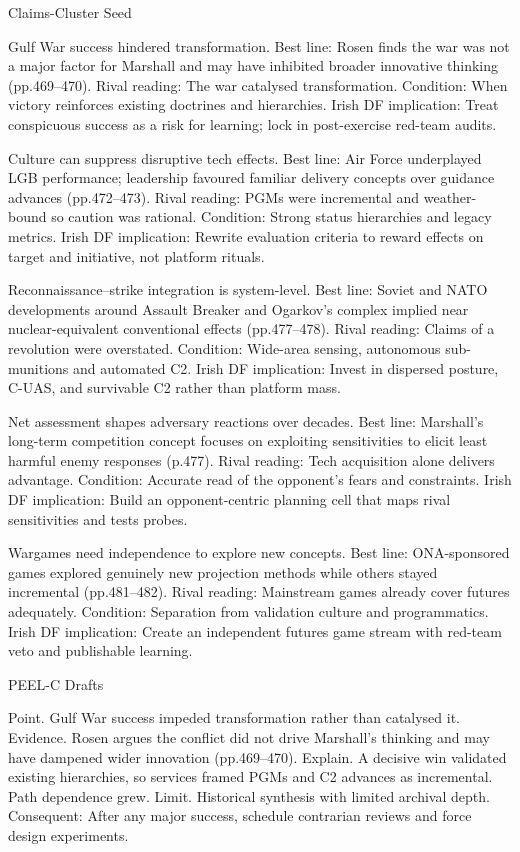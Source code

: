 Claims-Cluster Seed

Gulf War success hindered transformation.
Best line: Rosen finds the war was not a major factor for Marshall and may have inhibited broader innovative thinking (pp.469–470).
Rival reading: The war catalysed transformation.
Condition: When victory reinforces existing doctrines and hierarchies.
Irish DF implication: Treat conspicuous success as a risk for learning; lock in post-exercise red-team audits.

Culture can suppress disruptive tech effects.
Best line: Air Force underplayed LGB performance; leadership favoured familiar delivery concepts over guidance advances (pp.472–473).
Rival reading: PGMs were incremental and weather-bound so caution was rational.
Condition: Strong status hierarchies and legacy metrics.
Irish DF implication: Rewrite evaluation criteria to reward effects on target and initiative, not platform rituals.

Reconnaissance–strike integration is system-level.
Best line: Soviet and NATO developments around Assault Breaker and Ogarkov’s complex implied near nuclear-equivalent conventional effects (pp.477–478).
Rival reading: Claims of a revolution were overstated.
Condition: Wide-area sensing, autonomous sub-munitions and automated C2.
Irish DF implication: Invest in dispersed posture, C-UAS, and survivable C2 rather than platform mass.

Net assessment shapes adversary reactions over decades.
Best line: Marshall’s long-term competition concept focuses on exploiting sensitivities to elicit least harmful enemy responses (p.477).
Rival reading: Tech acquisition alone delivers advantage.
Condition: Accurate read of the opponent’s fears and constraints.
Irish DF implication: Build an opponent-centric planning cell that maps rival sensitivities and tests probes.

Wargames need independence to explore new concepts.
Best line: ONA-sponsored games explored genuinely new projection methods while others stayed incremental (pp.481–482).
Rival reading: Mainstream games already cover futures adequately.
Condition: Separation from validation culture and programmatics.
Irish DF implication: Create an independent futures game stream with red-team veto and publishable learning.

PEEL-C Drafts

Point. Gulf War success impeded transformation rather than catalysed it.
Evidence. Rosen argues the conflict did not drive Marshall’s thinking and may have dampened wider innovation (pp.469–470).
Explain. A decisive win validated existing hierarchies, so services framed PGMs and C2 advances as incremental. Path dependence grew.
Limit. Historical synthesis with limited archival depth. Consequent: After any major success, schedule contrarian reviews and force design experiments.

